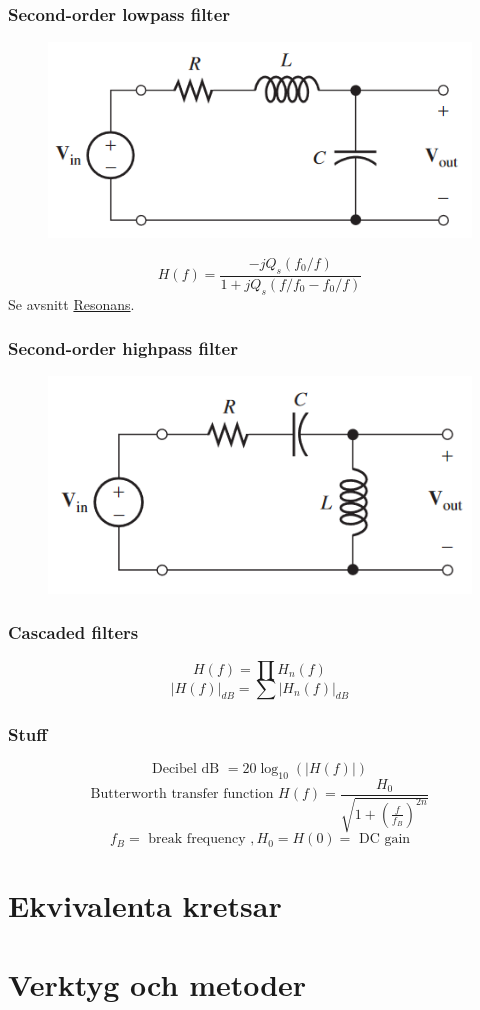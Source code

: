 \documentclass{article}
\begin{document}
\subsubsection{Second-order lowpass filter}
\begin{figure}[H]
    \centering
        \includegraphics[scale=1]{2nd-order-lowpass.png}
    \label{fig:2ndlowpass}
\end{figure}
\[ H(f) = \frac{-jQ_s(f_0/f)}{1+jQ_s(f/f_0-f_0/f)} \]
Se avsnitt \hyperref[sec:resonans]{Resonans}.

\subsubsection{Second-order highpass filter}
\begin{figure}[H]
    \centering
        \includegraphics[scale=1]{2nd-order-highpass.png}
    \label{fig:2ndhighpass}
\end{figure}


\subsubsection{Cascaded filters}
\[ H(f) = \prod H_n(f) \]
\[ |H(f)|_{dB} = \sum |H_n(f)|_{dB} \]

\subsubsection{Stuff}
\[ \textrm{Decibel dB } = 20 \log_{10}(|H(f)|) \]
\[ \textrm{Butterworth transfer function } H(f) = \frac{H_0}{\sqrt{1 + \left( \frac{f}{f_B} \right)^{2n}}} \]
\[ f_B = \textrm{ break frequency }, H_0 = H(0) = \textrm{ DC gain} \]


\section{Ekvivalenta kretsar}


\section{Verktyg och metoder}

\end{document}

